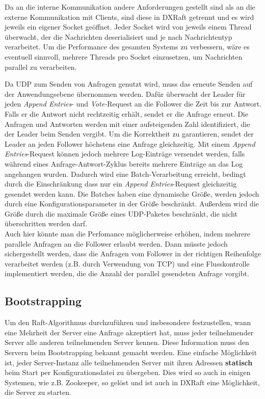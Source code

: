 Da an die interne Kommunikation andere Anforderungen gestellt sind als an die externe Kommunikation mit Clients, sind diese in DXRaft getrennt und es wird jeweils ein eigener Socket geöffnet. Jeder Socket wird von jeweils einem Thread überwacht, der die Nachrichten deserialisiert und je nach Nachrichtentyp verarbeitet. Um die Performance des gesamten Systems zu verbessern, wäre es eventuell sinnvoll, mehrere Threads pro Socket einzusetzen, um Nachrichten parallel zu verarbeiten.

Da UDP zum Senden von Anfragen genutzt wird, muss das erneute Senden auf der Anwendungsebene übernommen werden. Dafür überwacht der Leader für jeden \textit{Append Entries}- und \textit{Vote-}Request an die Follower die Zeit bis zur Antwort. Falls er die Antwort nicht rechtzeitig erhält, sendet er die Anfrage erneut. Die Anfragen und Antworten werden mit einer aufsteigenden Zahl identifiziert, die der Leader beim Senden vergibt. Um die Korrektheit zu garantieren, sendet der Leader an jeden Follower höchstens eine Anfrage gleichzeitig. Mit einem \textit{Append Entries}-Request können jedoch mehrere Log-Einträge versendet werden, falls während eines Anfrage-Antwort-Zyklus bereits mehrere Einträge an das Log angehangen wurden. Dadurch wird eine Batch-Verarbeitung erreicht, bedingt durch die Einschränkung dass nur ein \textit{Append Entries}-Request gleichzeitig gesendet werden kann. Die Batches haben eine dynamische Größe, werden jedoch durch eine Konfigurationsparameter in der Größe beschränkt. Außerdem wird die Größe durch die maximale Größe eines UDP-Paketes beschränkt, die nicht überschritten werden darf.\\
Auch hier könnte man die Perfomance möglicherweise erhöhen, indem mehrere parallele Anfragen an die Follower erlaubt werden. Dann müsste jedoch sichergestellt werden, dass die Anfragen vom Follower in der richtigen Reihenfolge verarbeitet werden (z.B. durch Verwendung von TCP) und eine Flusskontrolle implementiert werden, die die Anzahl der parallel gesendeten Anfrage vorgibt.

\subsection{Bootstrapping}

Um den Raft-Algorithmus durchzuführen und insbesondere festzustellen, wann eine Mehrheit der Server eine Anfrage akzeptiert hat, muss jeder teilnehmender Server alle anderen teilnehmenden Server kennen. Diese Information muss den Servern beim Bootstrapping bekannt gemacht werden. Eine einfache Möglichkeit ist, jeder Server-Instanz alle teilnehmenden Server mit ihren Adressen \textbf{statisch} beim Start per Konfigurationsdatei zu übergeben. Dies wird so auch in einigen Systemen, wie z.B. Zookeeper, so gelöst und ist auch in DXRaft eine Möglichkeit, die Server zu starten. 

